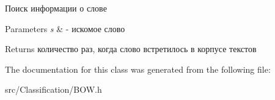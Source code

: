 Поиск информации о слове 


\begin{DoxyParams}{Parameters}
{\em s} & -\/ искомое слово \\
\hline
\end{DoxyParams}
\begin{DoxyReturn}{Returns}
количество раз, когда слово встретилось в корпусе текстов 
\end{DoxyReturn}


The documentation for this class was generated from the following file\+:\begin{DoxyCompactItemize}
\item 
src/\+Classification/B\+O\+W.\+h\end{DoxyCompactItemize}
